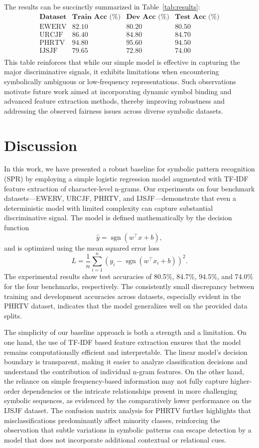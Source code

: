 \documentclass{article}
\begin{document}
The results can be succinctly summarized in Table~\ref{tab:results}:
\[
\begin{array}{lccc}
\textbf{Dataset} & \textbf{Train Acc (\%)} & \textbf{Dev Acc (\%)} & \textbf{Test Acc (\%)}\\ \hline
\text{EWERV} & 82.10 & 80.20 & 80.50 \\
\text{URCJF} & 86.40 & 84.80 & 84.70 \\
\text{PHRTV} & 94.80 & 95.60 & 94.50 \\
\text{IJSJF} & 79.65 & 72.80 & 74.00 \\
\end{array}
\]
This table reinforces that while our simple model is effective in capturing the major discriminative signals, it exhibits limitations when encountering symbolically ambiguous or low-frequency representations. Such observations motivate future work aimed at incorporating dynamic symbol binding and advanced feature extraction methods, thereby improving robustness and addressing the observed fairness issues across diverse symbolic datasets.

\section{Discussion}
In this work, we have presented a robust baseline for symbolic pattern recognition (SPR) by employing a simple logistic regression model augmented with TF-IDF feature extraction of character-level n-grams. Our experiments on four benchmark datasets—EWERV, URCJF, PHRTV, and IJSJF—demonstrate that even a deterministic model with limited complexity can capture substantial discriminative signal. The model is defined mathematically by the decision function 
\[
\hat{y} = \operatorname{sgn}(w^\top x + b),
\]
and is optimized using the mean squared error loss
\[
L = \frac{1}{n}\sum_{i=1}^{n}\left( y_i - \operatorname{sgn}(w^\top x_i + b) \right)^2.
\]
The experimental results show test accuracies of 80.5\%, 84.7\%, 94.5\%, and 74.0\% for the four benchmarks, respectively. The consistently small discrepancy between training and development accuracies across datasets, especially evident in the PHRTV dataset, indicates that the model generalizes well on the provided data splits.

The simplicity of our baseline approach is both a strength and a limitation. On one hand, the use of TF-IDF based feature extraction ensures that the model remains computationally efficient and interpretable. The linear model’s decision boundary is transparent, making it easier to analyze classification decisions and understand the contribution of individual n-gram features. On the other hand, the reliance on simple frequency-based information may not fully capture higher-order dependencies or the intricate relationships present in more challenging symbolic sequences, as evidenced by the comparatively lower performance on the IJSJF dataset. The confusion matrix analysis for PHRTV further highlights that misclassifications predominantly affect minority classes, reinforcing the observation that subtle variations in symbolic patterns can escape detection by a model that does not incorporate additional contextual or relational cues.
\end{document}
